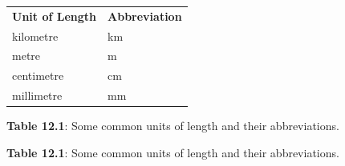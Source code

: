           \begin{table}[H]
        \begin{center}
      \label{m39370*uid8}
    \noindent
      \tablelasttail{}
      \begin{xtabular}[t]{|l|l|}\hline
                \textbf{Unit of Length}
               &
                \textbf{Abbreviation}
     \tabularnewline{}
        kilometre &
        km%
     \tabularnewline{}
        metre &
        m%
     \tabularnewline{}
        centimetre &
        cm%
     \tabularnewline{}
        millimetre &
        mm%
     \tabularnewline{}
    \end{xtabular}
      \end{center}
    \begin{center}{\small\bfseries Table 12.1}: Some common units of length and their abbreviations.\end{center}
    \begin{caption}{\small\bfseries Table 12.1}: Some common units of length and their abbreviations.\end{caption}
\end{table}
    \par
    \label{m39370*cid4}
